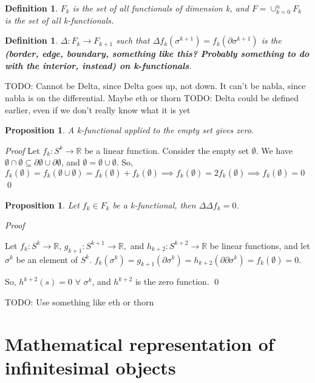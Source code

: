 \documentclass{book}
\newtheorem{defn}[equation]{Definition}
\newtheorem{prop}[equation]{Proposition}
\renewenvironment{proof}{\emph{Proof}}{\qed}
\begin{document}
\begin{defn}
	$F_k$ is the set of all functionals of dimension k, and $F = \cup_{k=0}^nF_k$ is the set of all k-functionals. 
\end{defn}


\begin{defn}
	$\Delta : F_k \to F_{k+1}$ such that $\Delta f_k(\sigma^{k+1}) = f_k(\partial \sigma^{k+1})$ is the \textbf{(border, edge, boundary, something like this? Probably something to do with the interior, instead) on k-functionals}. 
\end{defn}
TODO: Cannot be Delta, since Delta goes up, not down. It can't be nabla, since nabla is on the differential. Maybe eth or thorn 
TODO: Delta could be defined earlier, even if we don't really know what it is yet
\begin{prop}
	A k-functional applied to the empty set gives zero. 
\end{prop}
\begin{proof}
	Let $f_k : S^k \to \mathbb{R}$ be a linear function. Consider the empty set $\emptyset$. 
We have $\emptyset \cap \emptyset \subseteq \partial\emptyset \cup \partial\emptyset$, and $\emptyset = \emptyset\cup\emptyset$. 
So, $f_k(\emptyset) = f_k(\emptyset\cup\emptyset) = f_k(\emptyset) + f_k(\emptyset) \implies f_k(\emptyset) = 2f_k(\emptyset) \implies f_k(\emptyset) = 0$
\end{proof}



\begin{prop}
	Let $f_k \in F_k$ be a k-functional, then $\Delta\Delta f_k = 0 $.
	
	
\end{prop}
\begin{proof}


	Let $f_k : S^k \to \mathbb{R}$, $g_{k+1} : S^{k+1} \to \mathbb{R},$ and $h_{k+2}: S^{k+2} \to \mathbb{R}$ be linear functions, and let $\sigma^k$ be an element of $S^k$. $f_k(\sigma^k) = g_{k+1}(\partial \sigma^k) = h_{k+2}(\partial\partial \sigma^k) = f_k(\emptyset) = 0$. 
	
	So, $h^{k+2}(s) = 0$ $\forall$ $\sigma^k$, and $h^{k+2}$ is the zero function. 
\end{proof}

TODO: Use something like eth or thorn




\chapter{Mathematical representation of infinitesimal objects}
\end{document}
